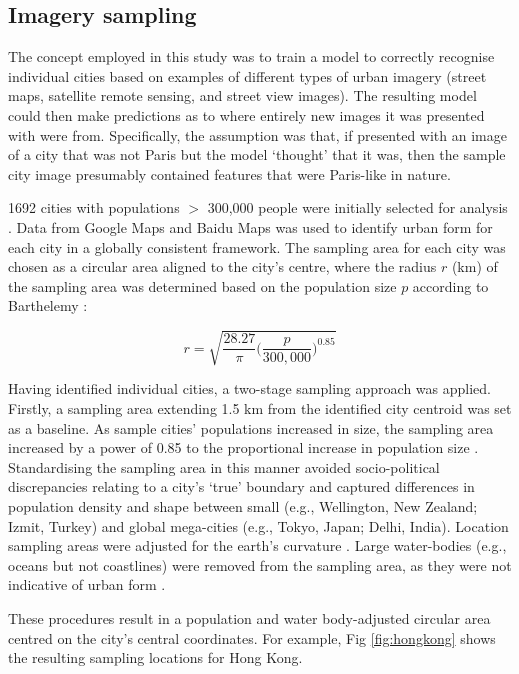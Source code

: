 \documentclass[10pt,letterpaper,hidelinks]{article}
\begin{document}
\subsection*{Imagery sampling}\label{sec:methods2}

The concept employed in this study was to train a model to correctly recognise individual cities based on examples of different types of urban imagery (street maps, satellite remote sensing, and street view images). The resulting model could then make predictions as to where entirely new images it was presented with were from. Specifically, the assumption was that, if presented with an image of a city that was not Paris but the model `thought' that it was, then the sample city image presumably contained features that were Paris-like in nature. 

1692 cities with populations $>$ 300,000 people were initially selected for analysis \cite{UN2014}. Data from Google Maps and Baidu Maps was used to identify urban form for each city in a globally consistent framework. The sampling area for each city was chosen as a circular area aligned to the city's centre, where the radius $r$ (km) of the sampling area was determined based on the population size $p$ according to Barthelemy \cite{Barthelemy2016}: 

\begin{equation}
r = \sqrt{ \frac{28.27}{\pi} \bigg( \frac{p}{300,000}  \bigg)^{0.85} }
\end{equation}

Having identified individual cities, a two-stage sampling approach was applied. Firstly, a sampling area extending 1.5 km from the identified city centroid \cite{UN2014} was set as a baseline. As sample cities' populations increased in size, the sampling area increased by a power of 0.85 to the proportional increase in population size \cite{Barthelemy2016}. Standardising the sampling area in this manner avoided socio-political discrepancies relating to a city's `true' boundary and captured differences in population density and shape between small (e.g., Wellington, New Zealand; Izmit, Turkey) and global mega-cities (e.g., Tokyo, Japan;  Delhi, India). Location sampling areas were adjusted for the earth's curvature \cite{Sinnott1984}. Large water-bodies (e.g., oceans but not coastlines) were removed from the sampling area, as they were not indicative of urban form . 

These procedures result in a population and water body-adjusted circular area centred on the city's central coordinates. For example, Fig \ref{fig:hongkong} shows the resulting sampling locations for Hong Kong.
\end{document}
